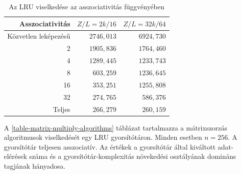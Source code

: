 \documentclass[12pt]{report}
\begin{document}
\begin{table}[ht]
\centering
\caption{Az LRU viselkedése az asszociativitás függvényében}
\label{table-mm-po2-factor-associativity}
\begin{tabular}{|r|r|r|}
\hline
Asszociativitás & $Z/L=2k/16$ & $Z/L=32k/64$ \\
\hline
Közvetlen leképezésű & $2746,013$ & $6924,730$ \\
\hline
2 & $1905,836$ & $1764,460$ \\
\hline
4 & $1289,445$ & $1233,743$ \\
\hline
8 & $603,259$ & $1236,645$ \\
\hline
16 & $353,251$ & $1255,808$ \\
\hline
32 & $274,765$ & $586,376$ \\
\hline
Teljes & $266,279$ & $260,159$ \\
\hline
\end{tabular}
\end{table}

A \ref{table-matrix-multiply-algorithms} táblázat tartalmazza
a mátrixszorzás algoritmusok viselkedését egy LRU gyorsítótáron.
Minden esetben $n=256$. A gyorsítótár teljesen asszociatív.
Az értékek a gyorsítótár által kiváltott adat-elérések száma
és a gyorsítótár-komplexitás növekedési osztályának domináns tagjának hányadosa.
\end{document}
